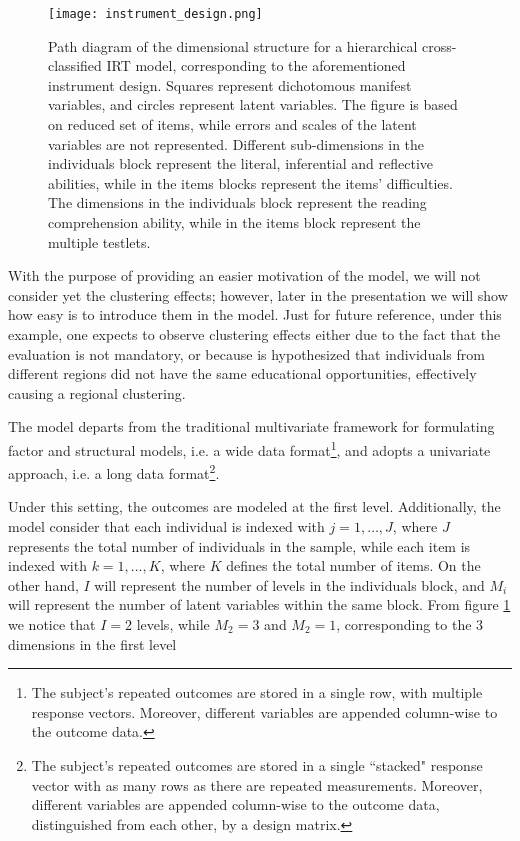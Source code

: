 \begin{figure}[h] \label{fig:design}
	\centering
	\texttt{[image: instrument\_design.png]}
	\caption{Path diagram of the dimensional structure for a hierarchical cross-classified IRT model, corresponding to the aforementioned instrument design. Squares represent dichotomous manifest variables, and circles represent latent variables. The figure is based on reduced set of items, while errors and scales of the latent variables are not represented. Different sub-dimensions in the individuals block represent the literal, inferential and reflective abilities, while in the items blocks represent the items' difficulties. The dimensions in the individuals block represent the reading comprehension ability, while in the items block represent the multiple testlets.}
\end{figure}

With the purpose of providing an easier motivation of the model, we will not consider yet the clustering effects; however, later in the presentation we will show how easy is to introduce them in the model. Just for future reference, under this example, one expects to observe clustering effects either due to the fact that the evaluation is not mandatory, or because is hypothesized that individuals from different regions did not have the same educational opportunities, effectively causing a regional clustering.

The model departs from the traditional multivariate framework for formulating factor and structural models, i.e. a wide data format\footnote{ The subject’s repeated outcomes are stored in a single row, with multiple response vectors. Moreover, different variables are appended column-wise to the outcome data. }, and adopts a univariate approach, i.e. a long data format\footnote{ The subject’s repeated outcomes are stored in a single ``stacked" response vector with as many rows as there are repeated measurements. Moreover, different variables are appended column-wise to the outcome data, distinguished from each other, by a design matrix. }. 

Under this setting, the outcomes are modeled at the first level. Additionally, the model consider that each individual is indexed with $j = 1, \dots, J$, where $J$ represents the total number of individuals in the sample, while each item is indexed with $k= 1, \dots, K$, where $K$ defines the total number of items. On the other hand, $I$ will represent the number of levels in the individuals block, and $M_{i}$ will represent the number of latent variables within the same block. From figure \ref{fig:design} we notice that $I=2$ levels, while $M_{2}=3$ and $M_{2}=1$, corresponding to the $3$ dimensions in the first level

